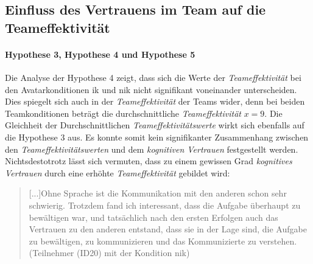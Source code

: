 \documentclass[a4paper,11pt]{article}%
\renewcommand{\\}{\vspace*{0.5\baselineskip} \newline}
\begin{document}
%
%
\subsection{Einfluss des Vertrauens im Team auf die Teameffektivität}
\paragraph{Hypothese 3, Hypothese 4 und Hypothese 5}

Die Analyse der Hypothese 4 zeigt, dass sich die Werte der \textit{Teameffektivität} bei den Avatarkonditionen \ac{ik} und \ac{nik} nicht signifikant voneinander unterscheiden. Dies spiegelt sich auch in der \textit{Teameffektivität} der Teams wider, denn bei beiden Teamkonditionen beträgt die durchschnittliche \textit{Teameffektivität} $x = 9$.
Die Gleichheit der Durchschnittlichen \textit{Teameffektivitätswerte} wirkt sich ebenfalls auf die Hypothese 3 aus. Es konnte somit kein signifikanter Zusammenhang zwischen den \textit{Teameffektivitätswerten} und dem \textit{kognitiven Vertrauen} festgestellt werden. Nichtsdestotrotz lässt sich vermuten, dass zu einem gewissen Grad \textit{kognitives Vertrauen} durch eine erhöhte \textit{Teameffektivität} gebildet wird: 
\begin{quote}
\glqq{}[...]Ohne Sprache ist die Kommunikation mit den anderen schon sehr schwierig. Trotzdem fand ich interessant, dass die Aufgabe überhaupt zu bewältigen war, und tatsächlich nach den ersten Erfolgen auch das Vertrauen zu den anderen entstand, dass sie in der Lage sind, die Aufgabe zu bewältigen, zu kommunizieren und das Kommunizierte zu verstehen.\dq{} (Teilnehmer (ID20) mit der Kondition \ac{nik}) 
\end{quote}
\end{document}
